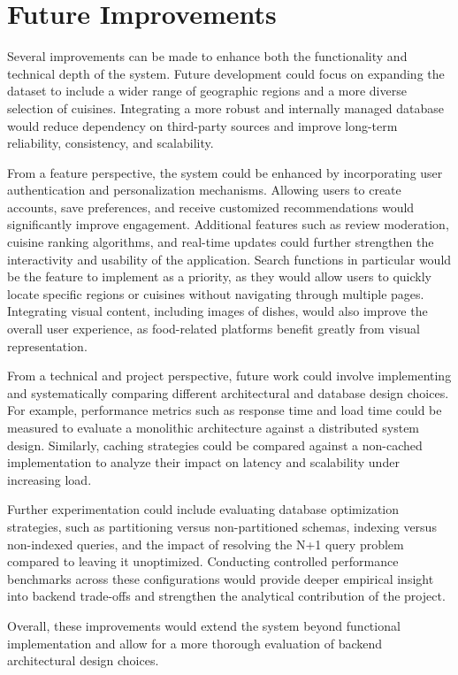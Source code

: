 \section{Future Improvements}

Several improvements can be made to enhance both the functionality and technical depth of the system. 
Future development could focus on expanding the dataset to include a wider range of geographic regions 
and a more diverse selection of cuisines. 
Integrating a more robust and internally managed database would reduce dependency on third-party sources 
and improve long-term reliability, consistency, and scalability.

From a feature perspective, the system could be enhanced by incorporating user authentication 
and personalization mechanisms. 
Allowing users to create accounts, save preferences, and receive customized recommendations 
would significantly improve engagement. 
Additional features such as review moderation, cuisine ranking algorithms, 
and real-time updates could further strengthen the interactivity and usability of the application.
Search functions in particular would be the feature to implement as a priority,
as they would allow users to quickly locate specific regions or cuisines without navigating through multiple pages.
Integrating visual content, including images of dishes, would also improve the overall user experience, 
as food-related platforms benefit greatly from visual representation.

From a technical and project perspective, future work could involve implementing and systematically 
comparing different architectural and database design choices. 
For example, performance metrics such as response time and load time could be measured 
to evaluate a monolithic architecture against a distributed system design. 
Similarly, caching strategies could be compared against a non-cached implementation 
to analyze their impact on latency and scalability under increasing load.

Further experimentation could include evaluating database optimization strategies, 
such as partitioning versus non-partitioned schemas, indexing versus non-indexed queries, 
and the impact of resolving the N+1 query problem compared to leaving it unoptimized. 
Conducting controlled performance benchmarks across these configurations 
would provide deeper empirical insight into backend trade-offs 
and strengthen the analytical contribution of the project.

Overall, these improvements would extend the system beyond functional implementation 
and allow for a more thorough evaluation of backend architectural design choices.